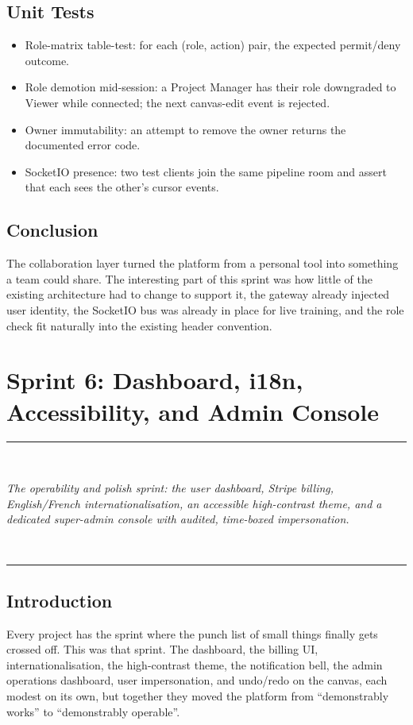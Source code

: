 \documentclass[12pt, a4paper, oneside]{report}
\newcommand{\chapterabstract}[1]{%
  \vspace*{1.2cm}%
  \begin{center}%
  \rule{0.45\textwidth}{0.4pt}\\[0.8em]%
  \begin{minipage}{0.82\textwidth}\centering\itshape\large #1\end{minipage}\\[0.8em]%
  \rule{0.45\textwidth}{0.4pt}%
  \end{center}%
  \vspace*{\fill}\clearpage}
\begin{document}
\section{Unit Tests}

\begin{itemize}
    \item Role-matrix table-test: for each (role, action) pair, the
        expected permit/deny outcome.
    \item Role demotion mid-session: a Project Manager has their
        role downgraded to Viewer while connected; the next
        canvas-edit event is rejected.
    \item Owner immutability: an attempt to remove the owner
        returns the documented error code.
    \item SocketIO presence: two test clients join the same
        pipeline room and assert that each sees the other's
        cursor events.
\end{itemize}

\section*{Conclusion}

The collaboration layer turned the platform from a personal tool
into something a team could share. The interesting part of this
sprint was how little of the existing architecture had to change to
support it, the gateway already injected user identity, the
SocketIO bus was already in place for live training, and the role
check fit naturally into the existing header convention.

\chapter{Sprint 6: Dashboard, i18n, Accessibility, and Admin Console}
\chapterabstract{The operability and polish sprint: the user dashboard, Stripe
billing, English/French internationalisation, an accessible high-contrast theme,
and a dedicated super-admin console with audited, time-boxed impersonation.}

\section*{Introduction}

Every project has the sprint where the punch list of small things
finally gets crossed off. This was that sprint. The dashboard, the
billing UI, internationalisation, the high-contrast theme, the
notification bell, the admin operations dashboard, user
impersonation, and undo/redo on the canvas, each modest on its
own, but together they moved the platform from ``demonstrably
works'' to ``demonstrably operable''.
\end{document}
